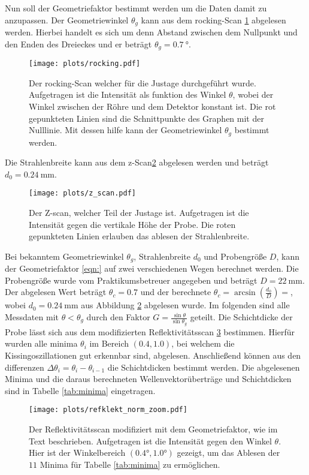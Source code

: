 Nun soll der Geometriefaktor bestimmt werden um die Daten damit zu anzupassen.
Der Geometriewinkel $\theta_g$ kann aus dem rocking-Scan \ref{fig:Dreieck} abgelesen werden. Hierbei handelt es sich um denn Abstand zwischen dem Nullpunkt und den Enden des Dreieckes und er beträgt $\theta_g = \SI{0.7}{\degree}$.
\begin{figure}
    \centering 
    \texttt{[image: plots/rocking.pdf]}
    \caption{Der rocking-Scan welcher für die Justage durchgeführt wurde. Aufgetragen ist die Intensität als funktion des Winkel $\theta$, wobei der Winkel zwischen der Röhre und dem Detektor konstant ist. Die rot gepunkteten Linien sind die Schnittpunkte des Graphen mit der Nulllinie. Mit dessen hilfe kann der Geometriewinkel $\theta_g$ bestimmt werden.}
    \label{fig:Dreieck}
\end{figure}
Die Strahlenbreite kann aus dem z-Scan\ref{fig:zScan} abgelesen werden und beträgt $d_0 = \SI{0.24}{\milli\meter}$.
\begin{figure}
    \centering 
    \texttt{[image: plots/z\_scan.pdf]}
    \caption{Der Z-scan, welcher Teil der Justage ist. Aufgetragen ist die Intensität gegen die vertikale Höhe der Probe. Die roten gepunkteten Linien erlauben das ablesen der Strahlenbreite. }
    \label{fig:zScan}
\end{figure}
Bei bekanntem Geometriewinkel $\theta_g$, Strahlenbreite $d_0$ und Probengröße $D$, kann der Geometriefaktor \ref{eqn:} auf zwei verschiedenen Wegen berechnet werden. Die Probengröße wurde vom Praktikumsbetreuer angegeben und beträgt $D = \SI{22}{\mm} $.
Der abgelesen Wert beträgt $\theta_c = 0.7$ und der berechnete $\theta_c = \arcsin\left(\frac{d_0}{D}  \right) = $, wobei $d_0 = \SI{0.24}{\mm} $ aus Abbildung \ref{fig:zScan} abgelesen wurde.
Im folgenden sind alle Messdaten mit $\theta < \theta_g$ durch den Faktor $G = \frac{\sin\theta }{\sin\theta_g}$ geteilt.
Die Schichtdicke der Probe lässt sich aus dem modifizierten Reflektivitätsscan \ref{fig:reflekt_norm} bestimmen. Hierfür wurden alle minima $\theta_i$ im Bereich $(0.4,1.0)$, bei welchem die Kissingoszillationen gut erkennbar sind, abgelesen.
Anschließend können aus den differenzen $\Delta \theta_i = \theta_i - \theta_{i-1}$ die Schichtdicken bestimmt werden. Die abgelesenen Minima und die daraus berechneten Wellenvektorüberträge und Schichtdicken sind in Tabelle \ref{tab:minima} eingetragen.
\begin{figure}
    \centering
        \texttt{[image: plots/refklekt\_norm\_zoom.pdf]}
    \caption{Der Reflektivitätsscan modifiziert mit dem Geometriefaktor, wie im Text beschrieben. Aufgetragen ist die Intensität gegen den Winkel $\theta$. Hier ist der Winkelbereich $(0.4°,1.0°)$ gezeigt, um das Ablesen der $11$ Minima für Tabelle \ref{tab:minima} zu ermöglichen.  }
    \label{fig:reflekt_norm}
\end{figure}
